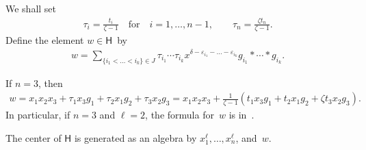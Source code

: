 We shall set
\begin{gather*}
\tau_i = \frac{t_i}{\zeta-1}
\quad
\text{for}
\quad
i=1,\ldots, n-1,
\qquad
\tau_n = \frac{\zeta t_n}{\zeta-1}.
\end{gather*}
Def\/ine the element $w \in \mathsf{H}$~by
\begin{gather*}
w = \sum\limits_{\{i_1<\dots<i_k\}\in J} \tau_{i_1}\cdots \tau_{i_k} x^{\delta-\varepsilon_{i_1} - \dots -
\varepsilon_{i_k}} g_{i_1}*\cdots * g_{i_k}.
\end{gather*}

\begin{Example}
If $n=3$, then
\begin{gather*}
w = x_1x_2x_3 +\tau_1 x_3 g_1 + \tau_2 x_1 g_2 + \tau_3 x_2 g_3
= x_1 x_2 x_3 +\frac{1}{\zeta-1} \left(t_1 x_3 g_1 + t_2 x_1 g_2 + \zeta t_3 x_2 g_3 \right).
\end{gather*}
In particular, if $n=3$ and $\ell=2$, the formula for~$w$ is in~\cite[Lemma~7.1]{CGW}.
\end{Example}

\begin{Theorem}
\label{T2}
The center of $\mathsf{H}$ is generated as an algebra by $x_1^\ell, \ldots, x_n^\ell$, and~$w$.
\end{Theorem}
